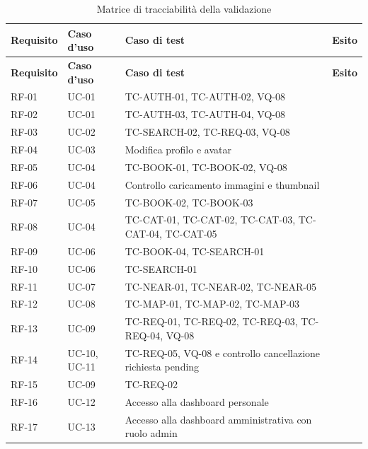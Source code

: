 \begin{longtable}{@{}p{}p{}p{}p{}@{}}
    \caption{Matrice di tracciabilità della validazione}
    \label{tab:validation-traceability} \\

    \toprule
    \textbf{Requisito} &
    \textbf{Caso d'uso} &
    \textbf{Caso di test} &
    \textbf{Esito} \\
    \midrule
    \endfirsthead

    \toprule
    \textbf{Requisito} &
    \textbf{Caso d'uso} &
    \textbf{Caso di test} &
    \textbf{Esito} \\
    \midrule
    \endhead

    RF-01 & UC-01 & TC-AUTH-01, TC-AUTH-02, VQ-08 & \testpass{} \\
    RF-02 & UC-01 & TC-AUTH-03, TC-AUTH-04, VQ-08 & \testpass{} \\
    RF-03 & UC-02 & TC-SEARCH-02, TC-REQ-03, VQ-08 & \testpass{} \\
    RF-04 & UC-03 & Modifica profilo e avatar & \testpass{} \\
    RF-05 & UC-04 & TC-BOOK-01, TC-BOOK-02, VQ-08 & \testpass{} \\
    RF-06 & UC-04 & Controllo caricamento immagini e thumbnail & \testpass{} \\
    RF-07 & UC-05 & TC-BOOK-02, TC-BOOK-03 & \testpass{} \\
    RF-08 & UC-04 & TC-CAT-01, TC-CAT-02, TC-CAT-03, TC-CAT-04, TC-CAT-05 & \testpass{} \\
    RF-09 & UC-06 & TC-BOOK-04, TC-SEARCH-01 & \testpass{} \\
    RF-10 & UC-06 & TC-SEARCH-01 & \testpass{} \\
    RF-11 & UC-07 & TC-NEAR-01, TC-NEAR-02, TC-NEAR-05 & \testpass{} \\
    RF-12 & UC-08 & TC-MAP-01, TC-MAP-02, TC-MAP-03 & \testpass{} \\
    RF-13 & UC-09 & TC-REQ-01, TC-REQ-02, TC-REQ-03, TC-REQ-04, VQ-08 & \testpass{} \\
    RF-14 & UC-10, UC-11 & TC-REQ-05, VQ-08 e controllo cancellazione richiesta pending & \testpass{} \\
    RF-15 & UC-09 & TC-REQ-02 & \testpass{} \\
    RF-16 & UC-12 & Accesso alla dashboard personale & \testpass{} \\
    RF-17 & UC-13 & Accesso alla dashboard amministrativa con ruolo admin & \testpass{} \\

\end{longtable}
